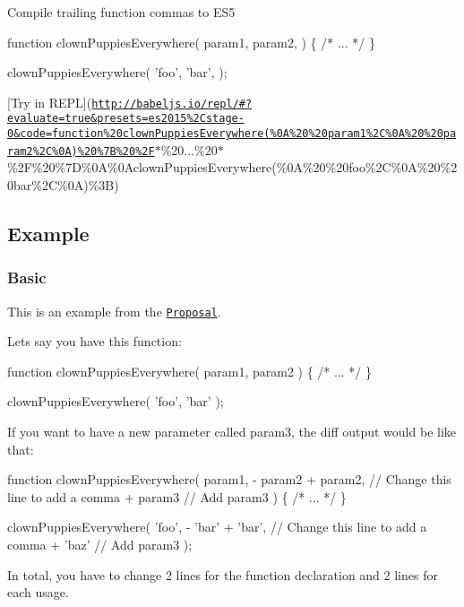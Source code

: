 Compile trailing function commas to E\+S5


\begin{DoxyCode}
function clownPuppiesEverywhere(
  param1,
  param2,
) \{ /* ... */ \}

clownPuppiesEverywhere(
  'foo',
  'bar',
);
\end{DoxyCode}
 \mbox{[}Try in R\+E\+PL\mbox{]}(\href{http://babeljs.io/repl/#?evaluate=true&presets=es2015%2Cstage-0&code=function%20clownPuppiesEverywhere(%0A%20%20param1%2C%0A%20%20param2%2C%0A)%20%7B%20%2F}{\tt http\+://babeljs.\+io/repl/\#?evaluate=true\&presets=es2015\%2\+Cstage-\/0\&code=function\%20clown\+Puppies\+Everywhere(\%0\+A\%20\%20param1\%2\+C\%0\+A\%20\%20param2\%2\+C\%0\+A)\%20\%7\+B\%20\%2F}$\ast$\%20...\%20$\ast$\%2F\%20\%7D\%0A\%0\+Aclown\+Puppies\+Everywhere(\%0A\%20\%20\textquotesingle{}foo\textquotesingle{}\%2C\%0A\%20\%20\textquotesingle{}bar\textquotesingle{}\%2C\%0A)\%3B)

\subsection*{Example}

\subsubsection*{Basic}

This is an example from the \href{https://github.com/jeffmo/es-trailing-function-commas}{\tt Proposal}.

Let\textquotesingle{}s say you have this function\+:


\begin{DoxyCode}
function clownPuppiesEverywhere(
  param1,
  param2
) \{ /* ... */ \}

clownPuppiesEverywhere(
  'foo',
  'bar'
);
\end{DoxyCode}


If you want to have a new parameter called {\ttfamily param3}, the diff output would be like that\+:


\begin{DoxyCode}
function clownPuppiesEverywhere(
  param1,
- param2
+ param2, // Change this line to add a comma
+ param3  // Add param3
) \{ /* ... */ \}

clownPuppiesEverywhere(
  'foo',
- 'bar'
+ 'bar', // Change this line to add a comma
+ 'baz'  // Add param3
);
\end{DoxyCode}
 In total, you have to change 2 lines for the function declaration and 2 lines for each usage.

